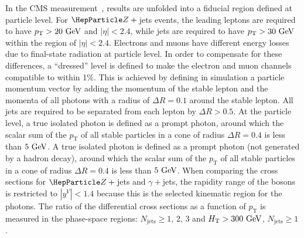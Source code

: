 \documentclass[11pt]{cernrep}
\begin{document}
In the CMS measurement~\cite{Khachatryan:2015ira}, results are
unfolded into a fiducial region defined at particle level. For
$\PZ+{}$jets events, the leading leptons are required to have
$p_{\mathrm{T}}>20~\text{GeV}$ and $|\eta|<2.4$, while jets are required to
have $p_{\mathrm{T}}>30~\text{GeV}$ within the region of $|\eta|<2.4$.
Electrons and muons have different energy losses due to final-state
radiation at particle level. In order to compensate for these
differences, a ``dressed'' level is defined to make the electron and
muon channels compatible to within 1\%. This is achieved by defining
in simulation a particle momentum vector by adding the momentum of the
stable lepton and the momenta of all photons with a radius of $\Delta
R=0.1$ around the stable lepton. All jets are required to be separated
from each lepton by $\Delta R>0.5$. At the particle level, a true
isolated photon is defined as a prompt photon, around which the scalar
sum of the $p_{\mathrm{T}}$ of all stable particles in a cone of
radius $\Delta R=0.4$ is less than $5~\text{GeV}$. A true isolated photon is
defined as a prompt photon (not generated by a hadron decay), around
which the scalar sum of the $p_{\mathrm{T}}$ of all stable particles
in a cone of radius $\Delta R=0.4$ is less than $5~\text{GeV}$. When comparing
the cross sections for $\PZ+{}$jets and $\gamma+{}$jets, the rapidity
range of the bosons is restricted to $|{y^{V}}|<1.4$ because this is
the selected kinematic region for the photons.  The ratio of the
differential cross sections as a function of $p_{\mathrm{T}}$ is
measured in the phase-space regions: $N_{\mathrm{jets}}\geq
1,\,2,\,3$ and $H_{\mathrm{T}}>300~\text{GeV}$, $N_{\mathrm{jets}}\geq1$.
\end{document}
